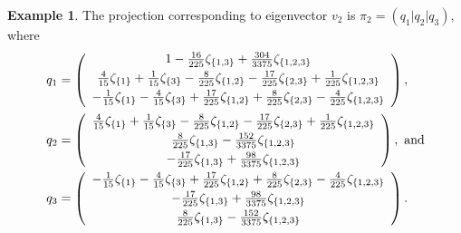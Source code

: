 \documentclass{article}
\theoremstyle{definition}
\newtheorem{example}[theorem]{Example}
\numberwithin{equation}{section}
\begin{document}
\begin{example}
The projection corresponding to eigenvector $v_2$ is $\pi_2=(q_1\vert q_2\vert q_3)$, where 
\begin{align*}
q_1&=\left(
\begin{array}{c}
 1-\frac{16}{225} \zeta _{\{1,3\}}+\frac{304}{3375} \zeta _{\{1,2,3\}}\vspace{3pt} \\
 \frac{4}{15} \zeta _{\{1\}}+\frac{1}{15}\zeta _{\{3\}}-\frac{8}{225} \zeta _{\{1,2\}}-\frac{17}{225} \zeta _{\{2,3\}}+\frac{1}{225} \zeta _{\{1,2,3\}} \vspace{3pt}\\
 -\frac{1}{15}\zeta _{\{1\}}-\frac{4}{15} \zeta _{\{3\}}+\frac{17}{225} \zeta _{\{1,2\}}+\frac{8}{225} \zeta _{\{2,3\}}-\frac{4}{225} \zeta _{\{1,2,3\}}\vspace{3pt} 
\end{array}
\right),\\
q_2&=\left(
\begin{array}{c}
\frac{4}{15} \zeta _{\{1\}}+\frac{1}{15}\zeta _{\{3\}} -\frac{8}{225} \zeta _{\{1,2\}}-\frac{17}{225} \zeta _{\{2,3\}}+\frac{1}{225} \zeta _{\{1,2,3\}} \vspace{3pt}\\
 \frac{8}{225} \zeta _{\{1,3\}}-\frac{152}{3375} \zeta _{\{1,2,3\}} \vspace{3pt}\\
 -\frac{17}{225} \zeta _{\{1,3\}} +\frac{98}{3375} \zeta _{\{1,2,3\}}
\end{array}
\right),\text{ \rm and}\\
q_3&=\left(
\begin{array}{c}
 -\frac{1}{15}\zeta _{\{1\}}-\frac{4}{15} \zeta _{\{3\}}+\frac{17}{225} \zeta _{\{1,2\}}+\frac{8}{225} \zeta _{\{2,3\}}-\frac{4}{225} \zeta _{\{1,2,3\}} \vspace{3pt}\\
 -\frac{17}{225} \zeta _{\{1,3\}}+\frac{98}{3375} \zeta _{\{1,2,3\}} \vspace{3pt}\\
 \frac{8}{225} \zeta _{\{1,3\}}-\frac{152}{3375} \zeta _{\{1,2,3\}} 
\end{array}
\right).
\end{align*}


\end{example}
\end{document}
